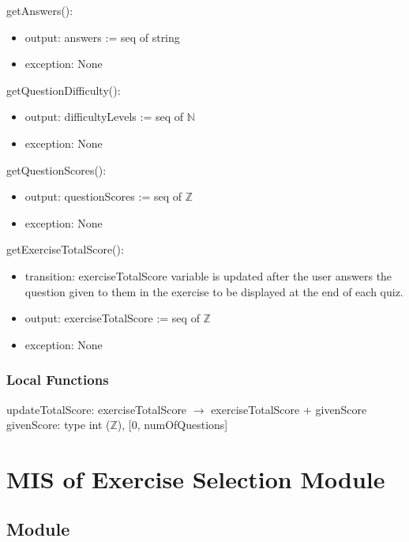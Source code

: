 \documentclass[12pt, titlepage]{article}
\begin{document}
\noindent getAnswers():
\begin{itemize}
\item output: answers := seq of string
\item exception: None
\end{itemize}

\noindent getQuestionDifficulty():
\begin{itemize}
\item output: difficultyLevels := seq of $\mathbb{N}$
\item exception: None
\end{itemize}

\noindent getQuestionScores():
\begin{itemize}
\item output: questionScores := seq of $\mathbb{Z}$
\item exception: None
\end{itemize}

\noindent getExerciseTotalScore():
\begin{itemize}
\item transition: exerciseTotalScore variable is updated after the user answers the question given to them in the exercise to be displayed at the end of each quiz.
\item output: exerciseTotalScore := seq of $\mathbb{Z}$
\item exception: None
\end{itemize}
%
\subsubsection{Local Functions}

updateTotalScore: exerciseTotalScore $\rightarrow$ exerciseTotalScore + givenScore \\
givenScore: type int ($\mathbb{Z}$), [0, numOfQuestions]


\newpage


\section{MIS of Exercise Selection Module} \label{ExerciseSel} 

\subsection{Module}
\end{document}

